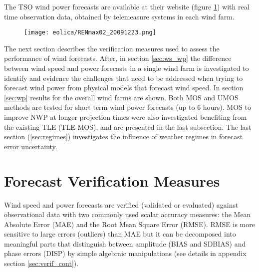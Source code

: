 The TSO wind power forecasts are available at their website (figure \ref{fig:ren_fcst}) with real time observation data, obtained by telemeasure systems in each wind farm. 

\begin{figure}[!htp]
    \centering
     \texttt{[image: eolica/RENmax02\_20091223.png]}
    \label{fig:ren_fcst}
\end{figure}
\FloatBarrier

The next section describes the verification measures used to assess the performance of wind forecasts. After, in section \ref{sec:ws_wp} the difference between wind speed and power forecasts in a single wind farm is investigated to identify and evidence the challenges that need to be addressed when trying to forecast wind power from physical models that forecast wind speed. In section \ref{sec:wp} results for the overall wind farms are shown. Both MOS and UMOS methods are tested for short term wind power forecasts (up to 6 hours). MOS to improve NWP at longer projection times were also investigated benefiting from the existing TLE (TLE-MOS), and are presented in the last subsection. The last section (\ref{sec:regimes}) investigates the influence of weather regimes in forecast error uncertainty.

\section{Forecast Verification Measures}

Wind speed and power forecasts are verified (validated or evaluated) against observational data with two commonly used scalar accuracy measures: the Mean Absolute Error (MAE) and the Root Mean Square Error (RMSE). RMSE is more sensitive to large errors (outliers) than MAE but it can be decomposed into meaningful parts that distinguish between amplitude (BIAS and SDBIAS) and phase errors (DISP) by simple algebraic manipulations (see details in appendix section \ref{sec:verif_cont}). 


